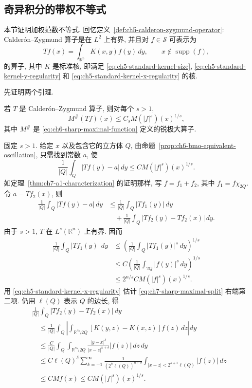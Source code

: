 \hypertarget{chapter-07-page-155}{}
\subsection{奇异积分的带权不等式}
\label{sec:ch7-weighted-singular-integrals}

本节证明加权范数不等式. 回忆定义~\ref{def:ch5-calderon-zygmund-operator}: Calderón--Zygmund 算子是在 $L^2$ 上有界, 并且对 $f\in\mathcal S$ 可表示为
\[
 Tf(x)=\int_{\mathbb R^n}K(x,y)f(y)\,dy,
 \qquad x\notin\operatorname{supp}(f),
\]
的算子, 其中 $K$ 是标准核, 即满足 \eqref{eq:ch5-standard-kernel-size}, \eqref{eq:ch5-standard-kernel-y-regularity} 和 \eqref{eq:ch5-standard-kernel-x-regularity} 的核.

先证明两个引理.

\begin{Lemma}
\label{lem:ch7-cz-sharp-maximal}
若 $T$ 是 Calderón--Zygmund 算子, 则对每个 $s>1$,
\[
 M^\#(Tf)(x)\le C_sM(|f|^s)(x)^{1/s},
\]
其中 $M^\#$ 是 \eqref{eq:ch6-sharp-maximal-function} 定义的锐极大算子.
\end{Lemma}

\begin{Proof}
固定 $s>1$. 给定 $x$ 以及包含它的立方体 $Q$, 由命题~\ref{prop:ch6-bmo-equivalent-oscillation}, 只需找到常数 $a$, 使
\[
 \frac1{|Q|}\int_Q|Tf(y)-a|\,dy
 \le CM(|f|^s)(x)^{1/s}.
\]
如定理~\ref{thm:ch7-a1-characterization} 的证明那样, 写 $f=f_1+f_2$, 其中 $f_1=f\chi_{2Q}$. 令 $a=Tf_2(x)$, 则
\begin{equation}
\label{eq:ch7-sharp-maximal-split}
\begin{aligned}
 \frac1{|Q|}\int_Q|Tf(y)-a|\,dy
 &\le\frac1{|Q|}\int_Q|Tf_1(y)|\,dy\\
 &\quad+\frac1{|Q|}\int_Q|Tf_2(y)-Tf_2(x)|\,dy.
\end{aligned}
\end{equation}
由于 $s>1$, $T$ 在 $L^s(\mathbb R^n)$ 上有界. 因而
\[
\begin{aligned}
 \frac1{|Q|}\int_Q|Tf_1(y)|\,dy
 &\le\left(\frac1{|Q|}\int_Q|Tf_1(y)|^s\,dy\right)^{1/s}\\
 &\le C\left(\frac1{|Q|}\int_{2Q}|f(y)|^s\,dy\right)^{1/s}\\
 &\le2^{n/s}CM(|f|^s)(x)^{1/s}.
\end{aligned}
\]
用 \eqref{eq:ch5-standard-kernel-x-regularity} 估计 \eqref{eq:ch7-sharp-maximal-split} 右端第二项. 仍用 $\ell(Q)$ 表示 $Q$ 的边长, 得
\[
\begin{aligned}
 &\frac1{|Q|}\int_Q|Tf_2(y)-Tf_2(x)|\,dy\\
 &\quad\le\frac1{|Q|}\int_Q
 \left|\int_{\mathbb R^n\setminus2Q}[K(y,z)-K(x,z)]f(z)\,dz\right|dy\\
 &\quad\le\frac C{|Q|}\int_Q\int_{\mathbb R^n\setminus2Q}
 \frac{|y-x|^\delta}{|x-z|^{n+\delta}}|f(z)|\,dz\,dy\\
 &\quad\le C\ell(Q)^\delta\sum_{k=-1}^\infty
 \frac1{(2^k\ell(Q))^{n+\delta}}
 \int_{|x-z|<2^{k+1}\ell(Q)}|f(z)|\,dz\\
 &\quad\le CMf(x)\le CM(|f|^s)(x)^{1/s}.
\end{aligned}
\]
\end{Proof}

